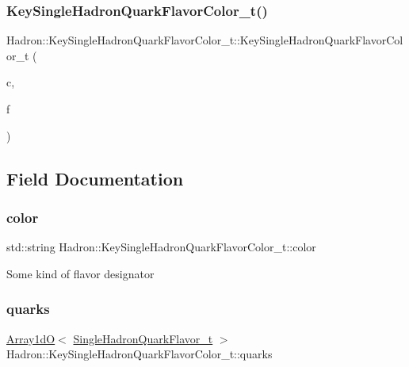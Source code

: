 \subsubsection{\texorpdfstring{KeySingleHadronQuarkFlavorColor\_t()}{KeySingleHadronQuarkFlavorColor\_t()}\hspace{0.1cm}{\footnotesize\ttfamily [15/15]}}
{\footnotesize\ttfamily Hadron\+::\+Key\+Single\+Hadron\+Quark\+Flavor\+Color\+\_\+t\+::\+Key\+Single\+Hadron\+Quark\+Flavor\+Color\+\_\+t (\begin{DoxyParamCaption}\item[{const std\+::string \&}]{c,  }\item[{const \mbox{\hyperlink{classADAT_1_1Array1dO}{Array1dO}}$<$ \mbox{\hyperlink{structHadron_1_1SingleHadronQuarkFlavor__t}{Single\+Hadron\+Quark\+Flavor\+\_\+t}} $>$ \&}]{f }\end{DoxyParamCaption})\hspace{0.3cm}{\ttfamily [inline]}}



\subsection{Field Documentation}
\mbox{\label{structHadron_1_1KeySingleHadronQuarkFlavorColor__t_aa5dc10dee689bef8e65d2b9230efdc85}} 
\subsubsection{\texorpdfstring{color}{color}}
{\footnotesize\ttfamily std\+::string Hadron\+::\+Key\+Single\+Hadron\+Quark\+Flavor\+Color\+\_\+t\+::color}

Some kind of flavor designator \mbox{\label{structHadron_1_1KeySingleHadronQuarkFlavorColor__t_ac52e7989b620c4733cc2e960394fd0fd}} 
\subsubsection{\texorpdfstring{quarks}{quarks}}
{\footnotesize\ttfamily \mbox{\hyperlink{classADAT_1_1Array1dO}{Array1dO}}$<$ \mbox{\hyperlink{structHadron_1_1SingleHadronQuarkFlavor__t}{Single\+Hadron\+Quark\+Flavor\+\_\+t}} $>$ Hadron\+::\+Key\+Single\+Hadron\+Quark\+Flavor\+Color\+\_\+t\+::quarks}

